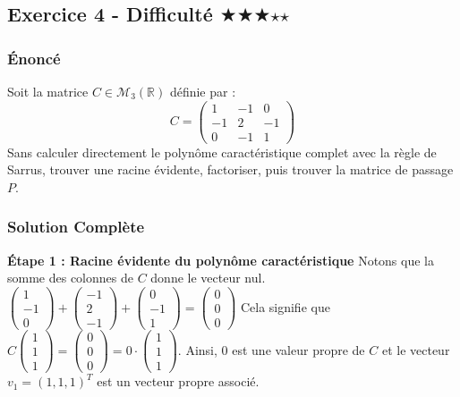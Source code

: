 \documentclass[11pt,a4paper]{article}
\begin{document}
\subsection*{Exercice 4 - Difficulté \quad $\bigstar$$\bigstar$$\bigstar$$\star$$\star$}

\subsubsection*{Énoncé}
Soit la matrice $C \in \mathcal{M}_3(\mathbb{R})$ définie par :
$$C = \begin{pmatrix} 1 & -1 & 0 \\ -1 & 2 & -1 \\ 0 & -1 & 1 \end{pmatrix}$$
Sans calculer directement le polynôme caractéristique complet avec la règle de Sarrus, trouver une racine évidente, factoriser, puis trouver la matrice de passage $P$.

\subsubsection*{Solution Complète}

\textbf{Étape 1 : Racine évidente du polynôme caractéristique}
Notons que la somme des colonnes de $C$ donne le vecteur nul.
$\begin{pmatrix} 1 \\ -1 \\ 0 \end{pmatrix} + \begin{pmatrix} -1 \\ 2 \\ -1 \end{pmatrix} + \begin{pmatrix} 0 \\ -1 \\ 1 \end{pmatrix} = \begin{pmatrix} 0 \\ 0 \\ 0 \end{pmatrix}$
Cela signifie que $C \begin{pmatrix} 1 \\ 1 \\ 1 \end{pmatrix} = \begin{pmatrix} 0 \\ 0 \\ 0 \end{pmatrix} = 0 \cdot \begin{pmatrix} 1 \\ 1 \\ 1 \end{pmatrix}$.
Ainsi, $0$ est une valeur propre de $C$ et le vecteur $v_1 = (1, 1, 1)^T$ est un vecteur propre associé.
\end{document}
